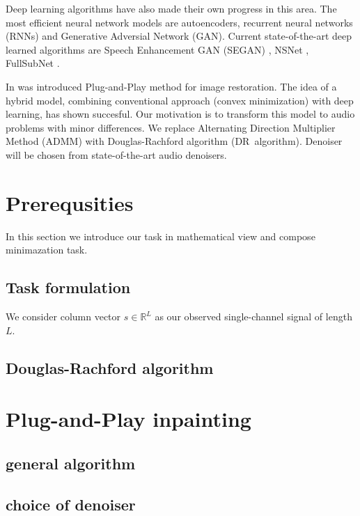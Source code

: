 \documentclass[conference]{IEEEtran}
\begin{document}
Deep learning algorithms have also made their own progress in this area.
The most efficient neural network models are autoencoders,
recurrent neural networks (RNNs) and
Generative Adversial Network (GAN).
Current state-of-the-art deep learned algorithms are Speech Enhancement GAN (SEGAN) \cite{Pascual2017}, NSNet \cite{Xia2020}, FullSubNet \cite{Hao2021}. 

In \cite{Chan2016} was introduced Plug-and-Play method for image restoration.
The idea of a hybrid model,
combining conventional approach (convex minimization) with deep learning,
has shown succesful.
Our motivation is to transform this model to audio problems with minor differences.
We replace Alternating Direction Multiplier Method (ADMM) with Douglas-Rachford algorithm (DR~algorithm).
Denoiser will be chosen from state-of-the-art audio denoisers. 
 

\section{Prerequsities}

In this section we introduce our task in mathematical view and compose minimazation task.

\subsection{Task formulation}

We consider column vector $ s \in \mathbb{R}^{L} $ as our observed single-channel signal of length $ L $.



\subsection{Douglas-Rachford algorithm}



\section{Plug-and-Play inpainting}

\subsection{general algorithm}

\subsection{choice of denoiser}
\end{document}
